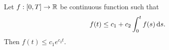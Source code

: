 \begin{lemma}
  \label{lemma:gronwall-inequality}
  Let $f:[0,T]\to\mathbb{R}$ be continuous function such that
  $$f(t) \le c_1 + c_2 \int_0^t f(s)\,\mathrm{d} s.$$
  Then $f (t) \le c_1e^{c_2t}$.
\end{lemma}













